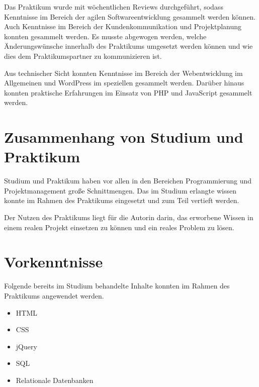 
Das Praktikum wurde mit wöchentlichen Reviews durchgeführt, sodass Kenntnisse im Bereich der agilen Softwareentwicklung gesammelt werden können. Auch Kenntnisse im Bereich der Kundenkommunikation und Projektplanung konnten gesammelt werden. Es musste abgewogen werden, welche Änderungswünsche innerhalb des Praktikums umgesetzt werden können und wie dies dem Praktikumspartner zu kommunizieren ist.

Aus technischer Sicht konnten Kenntnisse im Bereich der Webentwicklung im Allgemeinen und WordPress im speziellen gesammelt werden. Darüber hinaus konnten praktische Erfahrungen im Einsatz von PHP und JavaScript gesammelt werden.


\section{Zusammenhang von Studium und Praktikum}


Studium und Praktikum haben vor allen in den Bereichen Programmierung und Projektmanagement große Schnittmengen. Das im Studium erlangte wissen konnte im Rahmen des Praktikums eingesetzt und zum Teil vertieft werden.

Der Nutzen des Praktikums liegt für die Autorin darin, das erworbene Wissen in einem realen Projekt einsetzen zu können und ein reales Problem zu lösen.


\section{Vorkenntnisse}


Folgende bereits im Studium behandelte Inhalte konnten im Rahmen des Praktikums angewendet werden.

\begin{itemize}
	\item HTML
	\item CSS
	\item jQuery
	\item SQL
	\item Relationale Datenbanken
\end{itemize}


